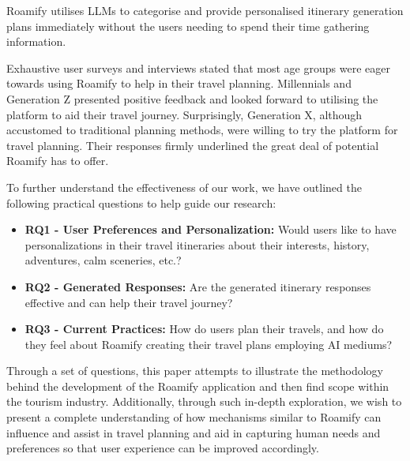 \documentclass[manuscript,review,anonymous]{acmart}
\begin{document}
    Roamify utilises LLMs to categorise and provide personalised itinerary generation plans immediately without the users needing to spend their time gathering information.
    
    Exhaustive user surveys and interviews stated that most age groups were eager towards using Roamify to help in their travel planning. Millennials and Generation Z presented positive feedback and looked forward to utilising the platform to aid their travel journey. Surprisingly, Generation X, although accustomed to traditional planning methods, were willing to try the platform for travel planning. Their responses firmly underlined the great deal of potential Roamify has to offer.
    
    To further understand the effectiveness of our work, we have outlined the following practical questions to help guide our research:
    
    \begin{itemize}
        \item \textbf{RQ1 - User Preferences and Personalization:} Would users like to have personalizations in their travel itineraries about their interests, history, adventures, calm sceneries, etc.?
        \item \textbf{RQ2 - Generated Responses:} Are the generated itinerary responses effective and can help their travel journey?
        \item \textbf{RQ3 - Current Practices:} How do users plan their travels, and how do they feel about Roamify creating their travel plans employing AI mediums?
    \end{itemize}
    
    Through a set of questions, this paper attempts to illustrate the methodology behind the development of the Roamify application and then find scope within the tourism industry. Additionally, through such in-depth exploration, we wish to present a complete understanding of how mechanisms similar to Roamify can influence and assist in travel planning and aid in capturing human needs and preferences so that user experience can be improved accordingly.

\vspace{-7pt}
\end{document}
